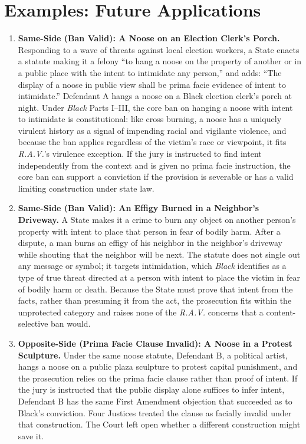 \documentclass[12pt]{article}
\begin{document}
\section{Examples: Future Applications}
\begin{enumerate}

\item \textbf{Same-Side (Ban Valid): A Noose on an Election Clerk's Porch.} Responding to a wave of threats against local election workers, a State enacts a statute making it a felony ``to hang a noose on the property of another or in a public place with the intent to intimidate any person,'' and adds: ``The display of a noose in public view shall be prima facie evidence of intent to intimidate.'' Defendant A hangs a noose on a Black election clerk's porch at night. Under \textit{Black} Parts I--III, the core ban on hanging a noose with intent to intimidate is constitutional: like cross burning, a noose has a uniquely virulent history as a signal of impending racial and vigilante violence, and because the ban applies regardless of the victim's race or viewpoint, it fits \textit{R.A.V.}'s virulence exception. If the jury is instructed to find intent independently from the context and is given no prima facie instruction, the core ban can support a conviction if the provision is severable or has a valid limiting construction under state law.

\item \textbf{Same-Side (Ban Valid): An Effigy Burned in a Neighbor's Driveway.} A State makes it a crime to burn any object on another person's property with intent to place that person in fear of bodily harm. After a dispute, a man burns an effigy of his neighbor in the neighbor's driveway while shouting that the neighbor will be next. The statute does not single out any message or symbol; it targets intimidation, which \textit{Black} identifies as a type of true threat directed at a person with intent to place the victim in fear of bodily harm or death. Because the State must prove that intent from the facts, rather than presuming it from the act, the prosecution fits within the unprotected category and raises none of the \textit{R.A.V.} concerns that a content-selective ban would.

\item \textbf{Opposite-Side (Prima Facie Clause Invalid): A Noose in a Protest Sculpture.} Under the same noose statute, Defendant B, a political artist, hangs a noose on a public plaza sculpture to protest capital punishment, and the prosecution relies on the prima facie clause rather than proof of intent. If the jury is instructed that the public display alone suffices to infer intent, Defendant B has the same First Amendment objection that succeeded as to Black's conviction. Four Justices treated the clause as facially invalid under that construction. The Court left open whether a different construction might save it.


\end{enumerate}
\end{document}
